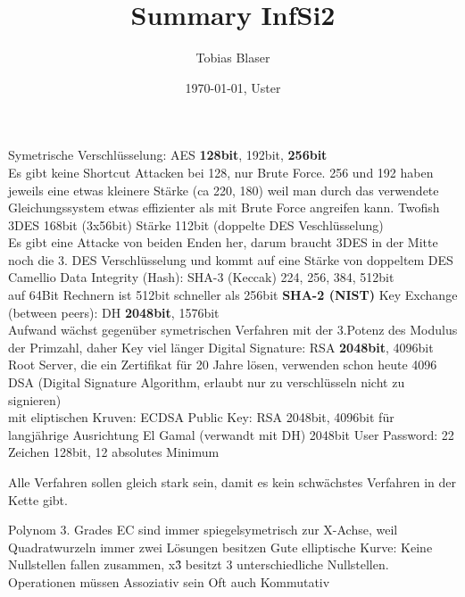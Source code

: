 \documentclass[ngerman,a4paper,12pt]{scrreprt}
\title{Summary InfSi2}
\author{Tobias Blaser}
\date{\today{}, Uster}
\begin{document}
\tableofcontents
\clearpage



\ul
	\li Symetrische Verschlüsselung: 
		\ul
			\li AES \textbf{128bit}, 192bit, \textbf{256bit} \\
			\ra Es gibt keine Shortcut Attacken bei 128, nur Brute Force. 256 und 192 haben jeweils eine etwas kleinere Stärke (ca 220, 180) weil man durch das verwendete Gleichungssystem etwas effizienter als mit Brute Force angreifen kann.
			\li Twofish 
			\li 3DES 168bit (3x56bit) \ra Stärke 112bit (doppelte DES Veschlüsselung) \\
				\ra Es gibt eine Attacke von beiden Enden her, darum braucht 3DES in der Mitte noch die 3. DES Verschlüsselung und kommt auf eine Stärke von doppeltem DES
			\li Camellio
		\ulE
	\li Data Integrity (Hash): 
		\ul
			\li SHA-3 (Keccak) 224, 256, 384, 512bit \\
				\ra auf 64Bit Rechnern ist 512bit schneller als 256bit
			\li \textbf{SHA-2 (NIST)}
		\ulE
	\li Key Exchange (between peers):
		\ul
			\li DH \textbf{2048bit}, 1576bit \\
			\ra Aufwand wächst gegenüber symetrischen Verfahren mit der 3.Potenz des Modulus der Primzahl, daher Key viel länger
		\ulE
	\li Digital Signature: 
		\ul
			\li RSA \textbf{2048bit}, 4096bit \\
			\ra Root Server, die ein Zertifikat für 20 Jahre lösen, verwenden schon heute 4096
			\li DSA (Digital Signature Algorithm, erlaubt nur zu verschlüsseln nicht zu signieren) \\
			\ra mit eliptischen Kruven: ECDSA
		\ulE
	\li Public Key:
		\ul
			\li RSA 2048bit, 4096bit für langjährige Ausrichtung
			\li El Gamal (verwandt mit DH) 2048bit
		\ulE
	\li User Password: 22 Zeichen \ra 128bit, 12 absolutes Minimum
\ulE


Alle Verfahren sollen gleich stark sein, damit es kein schwächstes Verfahren in der Kette gibt.

\ul
	\li Polynom 3. Grades
	\li EC sind immer spiegelsymetrisch zur X-Achse, weil Quadratwurzeln immer zwei Lösungen besitzen
	\li Gute elliptische Kurve: Keine Nullstellen fallen zusammen, x\^3 besitzt 3 unterschiedliche Nullstellen.
	\li Operationen müssen Assoziativ sein
	\li Oft auch Kommutativ
\ulE
\end{document}
